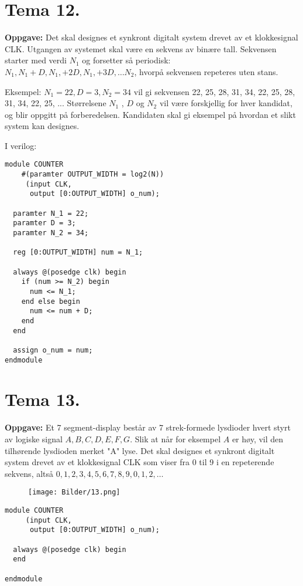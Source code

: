 \documentclass[a4paper,11pt,norsk]{article}
\begin{document}
\section{Tema 12.}
\begin{question}
    \textbf{Oppgave:}
        Det skal designes et synkront digitalt system drevet av et klokkesignal CLK.
        Utgangen av systemet skal være en sekvens av binære tall. Sekvensen
        starter med verdi $N_1$ og forsetter så periodisk: $N_1, N_1 + D, N_1, + 2D, N_1, +
        3D, \dots N_2$, hvorpå sekvensen repeteres uten stans.

        Eksempel: $N_1 = 22, D = 3, N_2 = 34$ vil gi sekvensen
        22, 25, 28, 31, 34, 22, 25, 28, 31, 34, 22, 25, ...
        Størrelsene $N_1$ , $D$ og $N_2$ vil være forskjellig for hver kandidat, og blir
        oppgitt på forberedelsen.
        Kandidaten skal gi eksempel på hvordan et slikt system kan designes.
\end{question}
I verilog:
\begin{tcolorbox}[colback=white, colframe=white!55!black]
\begin{verbatim}
module COUNTER
    #(paramter OUTPUT_WIDTH = log2(N))
     (input CLK,
      output [0:OUTPUT_WIDTH] o_num);

  paramter N_1 = 22;
  paramter D = 3;
  paramter N_2 = 34;

  reg [0:OUTPUT_WIDTH] num = N_1;

  always @(posedge clk) begin
    if (num >= N_2) begin
      num <= N_1;
    end else begin
      num <= num + D;
    end
  end

  assign o_num = num;
endmodule
\end{verbatim}
\end{tcolorbox}

\newpage
\section{Tema 13.}
\begin{question}
    \textbf{Oppgave:}
        Et 7 segment-display består av 7 strek-formede lysdioder hvert styrt av logiske
        signal $A, B, C, D, E, F, G$. Slik at når for eksempel $A$ er høy, vil den tilhørende
        lysdioden merket "A" lyse. Det skal designes et synkront digitalt system drevet av et
        klokkesignal CLK som viser fra 0 til 9 i en repeterende sekvens, altså $0, 1, 2, 3, 4, 5,
        6, 7, 8, 9, 0, 1, 2, \dots$

        \begin{figure}[H]
            \centering 
            \texttt{[image: Bilder/13.png]}
        \end{figure}
\end{question}
\begin{tcolorbox}[colback=white, colframe=white!55!black]
\begin{verbatim}
module COUNTER
     (input CLK,
      output [0:OUTPUT_WIDTH] o_num);

  always @(posedge clk) begin
  end

endmodule
\end{verbatim}
\end{tcolorbox}
\end{document}
